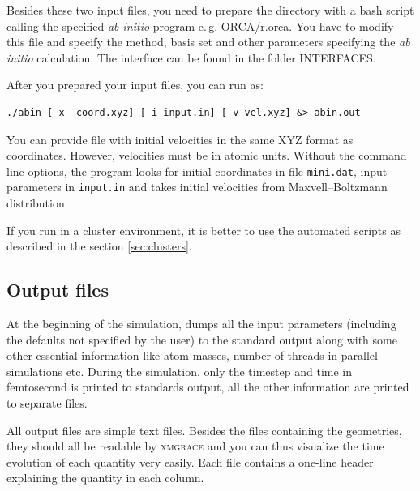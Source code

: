 Besides these two input files, you need to prepare the directory with a bash script calling the specified \textit{ab initio} program e.\,g. ORCA/r.orca. You have to modify this file and specify the method, basis set and other parameters specifying the \textit{ab initio} calculation. The interface can be found in the folder INTERFACES.

After you prepared your input files, you can run \abin as:

\begin{lstlisting}
./abin [-x  coord.xyz] [-i input.in] [-v vel.xyz] &> abin.out  
\end{lstlisting}

You can provide file with initial velocities in the same XYZ format as coordinates. However, velocities must be in atomic units. Without the command line options, the program looks for initial coordinates in file \texttt{mini.dat}, input parameters in \texttt{input.in} and takes initial velocities from Maxvell--Boltzmann distribution.

If you run \abin in a cluster environment, it is better to use the automated scripts as described in the section \ref{sec:clusters}.

\subsection{Output files}

At the beginning of the simulation, \abin dumps all the input parameters (including the defaults not specified by the user)
to the standard output along with some other essential information like atom masses, number of threads in parallel simulations etc.
During the simulation, only the timestep and time in femtosecond is printed to standards output, all the other information are printed to separate files.

All output files are simple text files. Besides the files containing the geometries, they should all be readable by \textsc{xmgrace} and you can thus visualize the time evolution of each quantity very easily. Each file contains a one-line header explaining the quantity in each column.

